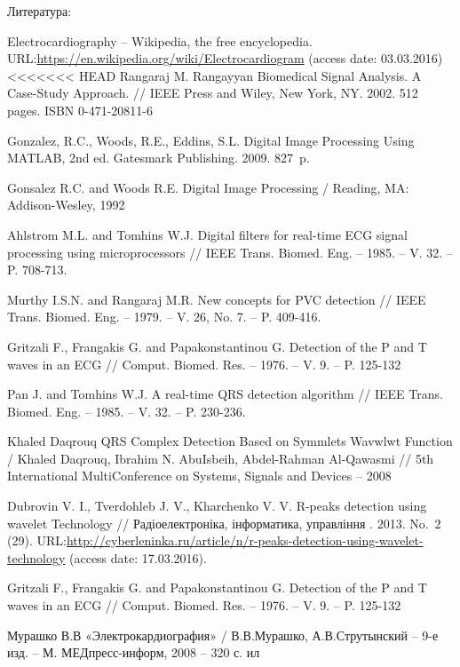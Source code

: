 \documentclass[runningheads]{AIIT}
\begin{document}
Литература:
%
%
 \begin{thebibliography}{99}
  Electrocardiography -- Wikipedia, the free encyclopedia. URL:\url{https://en.wikipedia.org/wiki/Electrocardiogram} (access date: 03.03.2016)
<<<<<<< HEAD
  Rangaraj M. Rangayyan Biomedical Signal Analysis. A Case-Study Approach. // IEEE Press and Wiley, New York, NY. 2002. 512 pages. ISBN 0-471-20811-6

  Gonzalez, R.C., Woods, R.E., Eddins, S.L. Digital Image Processing Using MATLAB, 2nd ed. Gatesmark Publishing. 2009. 827~p.

  Gonsalez R.C. and Woods R.E. Digital Image Processing / Reading, MA: Addison-Wesley, 1992

  Ahlstrom M.L. and Tomhins W.J. Digital filters for real-time ECG signal processing using microprocessors // IEEE Trans. Biomed. Eng. – 1985. – V. 32. – P. 708-713.

  Murthy I.S.N. and Rangaraj M.R. New concepts for PVC detection // IEEE Trans. Biomed. Eng. – 1979. – V. 26, No. 7. – P. 409-416.

  Gritzali F., Frangakis G. and Papakonstantinou G. Detection of the P and T waves in an ECG // Comput. Biomed. Res. – 1976. – V. 9. – P. 125-132

  Pan J. and Tomhins W.J. A real-time QRS detection algorithm // IEEE Trans. Biomed. Eng. – 1985. – V. 32. – P. 230-236.

  Khaled Daqrouq QRS Complex Detection Based on Symmlets Wavwlwt Function / Khaled Daqrouq, Ibrahim N. AbuIsbeih, Abdel-Rahman Al-Qawasmi // 5th International MultiConference on Systems, Signals and Devices – 2008

  Dubrovin V. I., Tverdohleb J. V., Kharchenko V. V. R-peaks detection using wavelet Technology // Радіоелектроніка, інформатика, управління . 2013. No.~2 (29). URL:\url{http://cyberleninka.ru/article/n/r-peaks-detection-using-wavelet-technology} (access date: 17.03.2016).

  Gritzali F., Frangakis G. and Papakonstantinou G. Detection of the P and T waves in an ECG // Comput. Biomed. Res. – 1976. – V. 9. – P. 125-132

  Мурашко В.В «Электрокардиография» / В.В.Мурашко, А.В.Струтынский – 9-е изд. – М. МЕДпресс-информ, 2008 – 320 с. ил

 \end{thebibliography}


%
%

\end{document}
